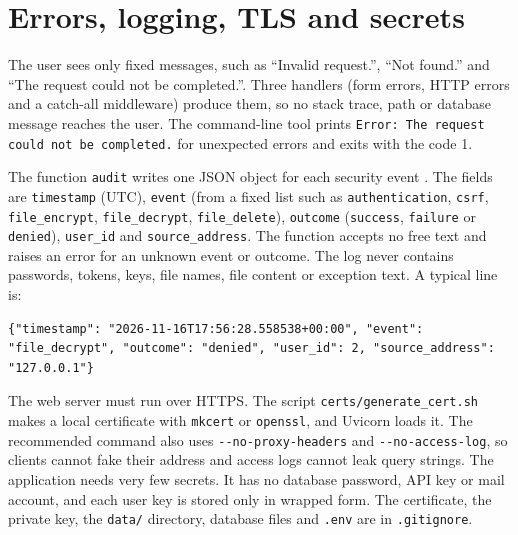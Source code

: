 \section{Errors, logging, TLS and secrets}

The user sees only fixed messages, such as ``Invalid request.'', ``Not found.'' and ``The request could not be completed.''. Three handlers (form errors, HTTP errors and a catch-all middleware) produce them, so no stack trace, path or database message reaches the user. The command-line tool prints \texttt{Error: The request could not be completed.} for unexpected errors and exits with the code 1.

The function \texttt{audit} writes one JSON object for each security event \cite{owaspLogging}. The fields are \texttt{timestamp} (UTC), \texttt{event} (from a fixed list such as \texttt{authentication}, \texttt{csrf}, \texttt{file\_encrypt}, \texttt{file\_decrypt}, \texttt{file\_delete}), \texttt{outcome} (\texttt{success}, \texttt{failure} or \texttt{denied}), \texttt{user\_id} and \texttt{source\_address}. The function accepts no free text and raises an error for an unknown event or outcome. The log never contains passwords, tokens, keys, file names, file content or exception text. A typical line is:

\begin{lstlisting}[frame=single, basicstyle=\scriptsize, breaklines=true]
{"timestamp": "2026-11-16T17:56:28.558538+00:00", "event": "file_decrypt", "outcome": "denied", "user_id": 2, "source_address": "127.0.0.1"}
\end{lstlisting}

The web server must run over HTTPS. The script \texttt{certs/generate\_cert.sh} makes a local certificate with \texttt{mkcert} or \texttt{openssl}, and Uvicorn loads it. The recommended command also uses \texttt{-{}-no-proxy-headers} and \texttt{-{}-no-access-log}, so clients cannot fake their address and access logs cannot leak query strings. The application needs very few secrets. It has no database password, API key or mail account, and each user key is stored only in wrapped form. The certificate, the private key, the \texttt{data/} directory, database files and \texttt{.env} are in \texttt{.gitignore}.
